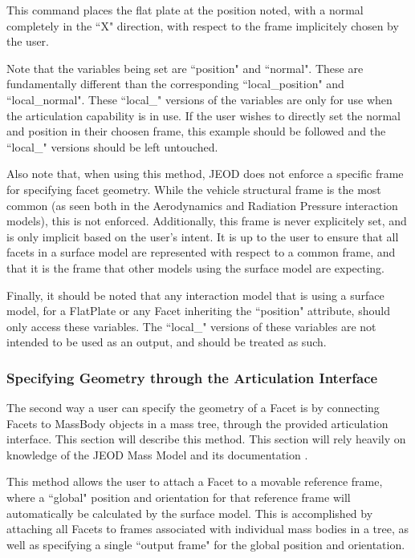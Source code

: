 This command places the flat plate at the position noted,
with a normal completely in the ``X" direction, with respect to
the frame implicitely chosen by the user.

Note that the variables being set are ``position" and ``normal".
These are fundamentally different than the corresponding
``local\_position" and ``local\_normal". These ``local\_" versions
of the variables are only for use when the articulation
capability is in use. If the user wishes
to directly set the normal and position in their choosen frame,
this example should be followed and the ``local\_" versions
should be left untouched.

Also note that, when using this method, JEOD does not enforce a specific
frame for specifying facet geometry. While the vehicle structural frame
is the most common (as seen both in the Aerodynamics \cite{dynenv:AERODYNAMICS}
and Radiation Pressure \cite{dynenv:RADIATIONPRESSURE} interaction
models), this is not enforced. Additionally, this frame
is never explicitely set, and is only implicit based on the
user's intent. It is up to the user to
ensure that all facets in a surface model are represented with respect
to a common frame, and that it is the frame that other models
using the surface model are expecting.

Finally, it should be noted that any interaction model that is using a surface
model, for a FlatPlate or any Facet inheriting the ``position" attribute,
should only access these variables. The ``local\_" versions of these variables
are not intended to be used as an output, and should be treated as such.

\subsubsection{Specifying Geometry through the Articulation Interface}

The second way a user can specify the geometry of a Facet is
by connecting Facets to MassBody objects in a mass tree, through
the provided articulation interface. This section will describe
this method. This section will rely heavily on knowledge of the JEOD
Mass Model and its documentation \cite{dynenv:MASS}.

This method allows the user to attach a Facet to a movable reference frame, where a ``global"
position and orientation for that reference frame will automatically be calculated by the surface
model. This is accomplished by attaching all Facets to frames associated with individual
mass bodies in a tree, as well as specifying a single ``output frame" for the global
position and orientation.

